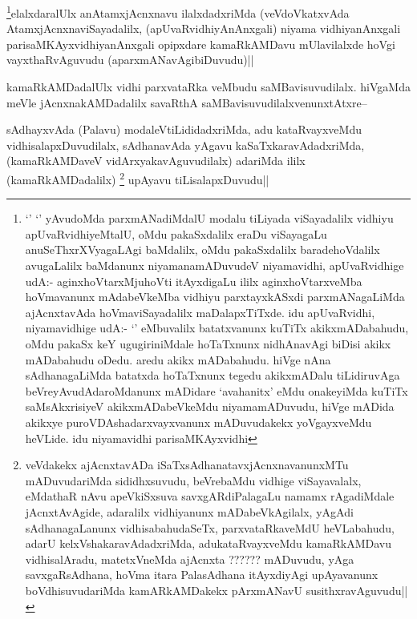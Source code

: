 \begin{artha}
\footnote{`\stext' `\stext' yAvudoMda parxmANadiMdalU modalu tiLiyada viSayadalilx vidhiyu apUvaRvidhiyeMtalU, oMdu pakaSxdalilx eraDu viSayagaLu anuSeThxrXVyagaLAgi baMdalilx, oMdu pakaSxdalilx baradehoVdalilx avugaLalilx baMdanunx niyamanamADuvudeV niyamavidhi, apUvaRvidhige udA:- aginxhoVtarxMjuhoVti itAyxdigaLu ililx aginxhoVtarxveMba hoVmavanunx mAdabeVkeMba vidhiyu parxtayxkASxdi parxmANagaLiMda ajAcnxtavAda hoVmaviSayadalilx maDalapxTiTxde. idu apUvaRvidhi, niyamavidhige udA:- `\stext' eMbuvalilx batatxvanunx kuTiTx akikxmADabahudu, oMdu pakaSx keY ugugiriniMdale hoTaTxnunx nidhAnavAgi biDisi akikx mADabahudu oDedu. aredu akikx mADabahudu. hiVge nAna sAdhanagaLiMda batatxda hoTaTxnunx tegedu akikxmADalu tiLidiruvAga beVreyAvudAdaroMdanunx mADidare `avahanitx' eMdu onakeyiMda kuTiTx saMsAkxrisiyeV akikxmADabeVkeMdu niyamamADuvudu, hiVge mADida akikxye puroVDAshadarxvayxvanunx mADuvudakekx yoVgayxveMdu heVLide. idu niyamavidhi parisaMKAyxvidhi}elalxdaralUlx anAtamxjAcnxnavu ilalxdadxriMda (veVdoVkatxvAda AtamxjAcnxnaviSayadalilx, (apUvaRvidhiyAnAnxgali) niyama vidhiyanAnxgali parisaMKAyxvidhiyanAnxgali opipxdare kamaRkAMDavu mUlavilalxde hoVgi vayxthaRvAguvudu (aparxmANavAgibiDuvudu)||
\end{artha}

\begin{artha}
kamaRkAMDadalUlx vidhi parxvataRka veMbudu saMBavisuvudilalx. hiVgaMda meVle jAcnxnakAMDadalilx savaRthA saMBavisuvudilalxvenunxtAtxre--
\end{artha}

\begin{artha}
sAdhayxvAda (Palavu) modaleVtiLididadxriMda, adu kataRvayxveMdu vidhisalapxDuvudilalx, sAdhanavAda yAgavu kaSaTxkaravAdadxriMda,(kamaRkAMDaveV vidArxyakavAguvudilalx) adariMda ililx (kamaRkAMDadalilx) \footnote{veVdakekx ajAcnxtavADa iSaTxsAdhanatavxjAcnxnavanunxMTu mADuvudariMda sididhxsuvudu, beVrebaMdu vidhige viSayavalalx, eMdathaR nAvu apeVkiSxsuva savxgARdiPalagaLu namamx rAgadiMdale jAcnxtAvAgide, adaralilx vidhiyanunx mADabeVkAgilalx, yAgAdi sAdhanagaLanunx vidhisabahudaSeTx, parxvataRkaveMdU heVLabahudu, adarU kelxVshakaravAdadxriMda, adukataRvayxveMdu kamaRkAMDavu vidhisalAradu, matetxVneMda ajAcnxta ?????? mADuvudu, yAga savxgaRsAdhana, hoVma itara PalasAdhana itAyxdiyAgi upAyavanunx boVdhisuvudariMda kamARkAMDakekx pArxmANavU susithxravAguvudu||} upAyavu tiLisalapxDuvudu||
\end{artha}

